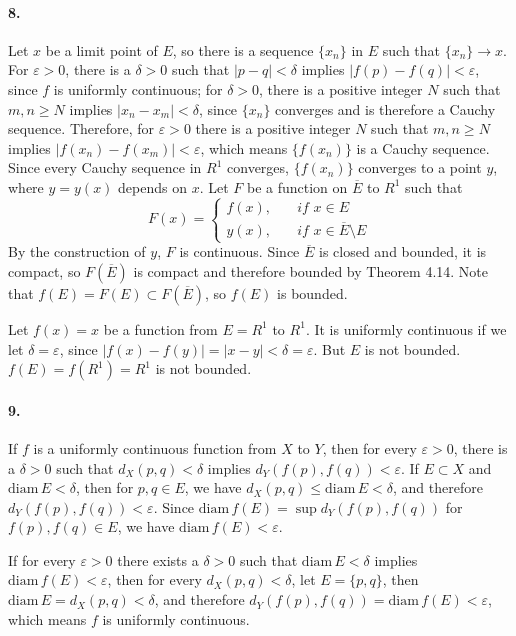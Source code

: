 \documentclass[a4paper]{article}
\begin{document}
\paragraph{8.}
Let $x$ be a limit point of $E$, so there is a sequence $\{x_n\}$ in $E$ such that $\{x_n\}\to x$. For $\varepsilon>0$, there is a $\delta>0$ such that $|p-q|<\delta$ implies $|f(p)-f(q)|<\varepsilon$, since $f$ is uniformly continuous; for $\delta>0$, there is a positive integer $N$ such that $m,n\geq N$ implies $|x_n-x_m|<\delta$, since $\{x_n\}$ converges and is therefore a Cauchy sequence. Therefore, for $\varepsilon>0$ there is a positive integer $N$ such that $m,n\geq N$ implies $|f(x_n)-f(x_m)|<\varepsilon$, which means $\{f(x_n)\}$ is a Cauchy sequence. Since every Cauchy sequence in $R^1$ converges, $\{f(x_n)\}$ converges to a point $y$, where $y=y(x)$ depends on $x$. Let $F$ be a function on $\overline{E}$ to $R^1$ such that
\[
F(x)=\begin{cases}
f(x),\quad & \textit{if $x\in E$}\\
y(x),\quad & \textit{if $x\in \overline{E}\setminus E$}
\end{cases}
\]
By the construction of $y$,\; $F$ is continuous. Since $\overline{E}$ is closed and bounded, it is compact, so $F(\overline{E})$ is compact and therefore bounded by Theorem 4.14. Note that $f(E)=F(E)\subset F(\overline{E})$, so $f(E)$ is bounded.
\smallskip

Let $f(x)=x$ be a function from $E=R^1$ to $R^1$. It is uniformly continuous if we let $\delta=\varepsilon$, since $|f(x)-f(y)|=|x-y|<\delta=\varepsilon$. But $E$ is not bounded. $f(E)=f(R^1)=R^1$ is not bounded.

\paragraph{9.}
If $f$ is a uniformly continuous function from $X$ to $Y$, then for every $\varepsilon>0$, there is a $\delta>0$ such that $d_X(p,q)<\delta$ implies $d_Y(f(p),f(q))<\varepsilon$. If $E\subset X$ and $\mathrm{diam}\,E<\delta$, then for $p,q\in E$, we have $d_X(p,q)\leq\mathrm{diam}\,E<\delta$, and therefore $d_Y(f(p),f(q))<\varepsilon$. Since $\mathrm{diam}\,f(E)=\sup d_Y(f(p),f(q))$ for $f(p),f(q)\in E$, we have $\mathrm{diam}\,f(E)<\varepsilon$.
\smallskip

If for every $\varepsilon>0$ there exists a $\delta>0$ such that $\mathrm{diam}\,E<\delta$ implies $\mathrm{diam}\,f(E)<\varepsilon$, then for every $d_X(p,q)<\delta$, let $E=\{p,q\}$, then $\mathrm{diam}\,E=d_X(p,q)<\delta$, and therefore $d_Y(f(p),f(q))=\mathrm{diam}\,f(E)<\varepsilon$, which means $f$ is uniformly continuous.
\end{document}
